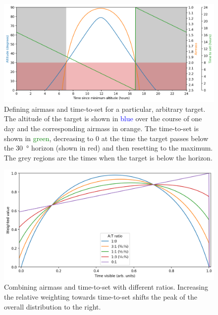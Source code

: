 \begin{colsection}
\begin{colsection}
\begin{figure}[p]
    \begin{center}
        \includegraphics[width=\linewidth]{images/airmass-tts.png}
    \end{center}
    \caption[Defining airmass and time-to-set for a given target]{
        Defining airmass and time-to-set for a particular, arbitrary target. The altitude of the target is shown in \textcolor{Blue}{blue} over the course of one day and the corresponding airmass in \textcolor{BurntOrange}{orange}. The time-to-set is shown in \textcolor{Green}{green}, decreasing to 0 at the time the target passes below the \SI{30}{\degree} horizon (shown in red) and then resetting to the maximum. The grey regions are the times when the target is below the horizon.
    }\label{fig:airmass_tts}
\end{figure}

\begin{figure}[p]
    \begin{center}
        \includegraphics[width=\linewidth]{images/at_ratio.png}
    \end{center}
    \caption[Combining airmass and time-to-set with different ratios]{
        Combining airmass and time-to-set with different ratios. Increasing the relative weighting towards time-to-set shifts the peak of the overall distribution to the right.
    }\label{fig:at_ratio}
\end{figure}


\end{colsection}
\end{colsection}
